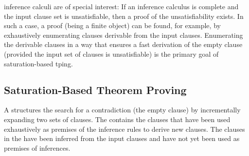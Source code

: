  inference calculi are of special interest:
If an inference calculus is complete and the input clause set is unsatisfiable,
then a proof of the unsatisfiability exists.
In such a case, a proof (being a finite object) can be found, for example, by
exhaustively
enumerating clauses derivable from the input clauses.
Enumerating the derivable clauses in a way that ensures a fast derivation of the empty clause (provided the input set of clauses is unsatisfiable) is the primary goal of saturation-based \gls{tping}.




\subsection{Saturation-Based Theorem Proving}

A  structures the search for a contradiction
(the empty clause)
by incrementally expanding two sets of clauses.
The  contains the clauses that
have been used exhaustively as premises of the inference rules to derive new clauses.
The clauses in the  have been inferred from the input clauses and have not yet been used as premises of inferences.

